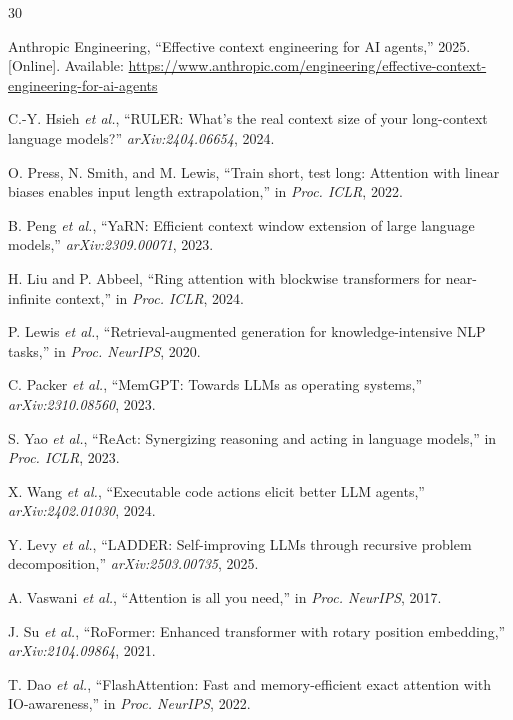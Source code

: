 \documentclass[journal, 10pt, letterpaper]{IEEEtran}
\begin{document}

\begin{thebibliography}{30}

Anthropic Engineering,
``Effective context engineering for AI agents,''
2025. [Online]. Available: \url{https://www.anthropic.com/engineering/effective-context-engineering-for-ai-agents}

C.-Y. Hsieh \textit{et al.},
``RULER: What's the real context size of your long-context language models?''
\textit{arXiv:2404.06654}, 2024.

O. Press, N. Smith, and M. Lewis,
``Train short, test long: Attention with linear biases enables input length extrapolation,''
in \textit{Proc. ICLR}, 2022.

B. Peng \textit{et al.},
``YaRN: Efficient context window extension of large language models,''
\textit{arXiv:2309.00071}, 2023.

H. Liu and P. Abbeel,
``Ring attention with blockwise transformers for near-infinite context,''
in \textit{Proc. ICLR}, 2024.

P. Lewis \textit{et al.},
``Retrieval-augmented generation for knowledge-intensive NLP tasks,''
in \textit{Proc. NeurIPS}, 2020.

C. Packer \textit{et al.},
``MemGPT: Towards LLMs as operating systems,''
\textit{arXiv:2310.08560}, 2023.

S. Yao \textit{et al.},
``ReAct: Synergizing reasoning and acting in language models,''
in \textit{Proc. ICLR}, 2023.

X. Wang \textit{et al.},
``Executable code actions elicit better LLM agents,''
\textit{arXiv:2402.01030}, 2024.

Y. Levy \textit{et al.},
``LADDER: Self-improving LLMs through recursive problem decomposition,''
\textit{arXiv:2503.00735}, 2025.

A. Vaswani \textit{et al.},
``Attention is all you need,''
in \textit{Proc. NeurIPS}, 2017.

J. Su \textit{et al.},
``RoFormer: Enhanced transformer with rotary position embedding,''
\textit{arXiv:2104.09864}, 2021.

T. Dao \textit{et al.},
``FlashAttention: Fast and memory-efficient exact attention with IO-awareness,''
in \textit{Proc. NeurIPS}, 2022.


\end{thebibliography}
\end{document}
